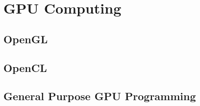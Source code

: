 \chapter{GPU Computing}

\section{OpenGL}
\section{OpenCL}
\section{General Purpose GPU Programming}


